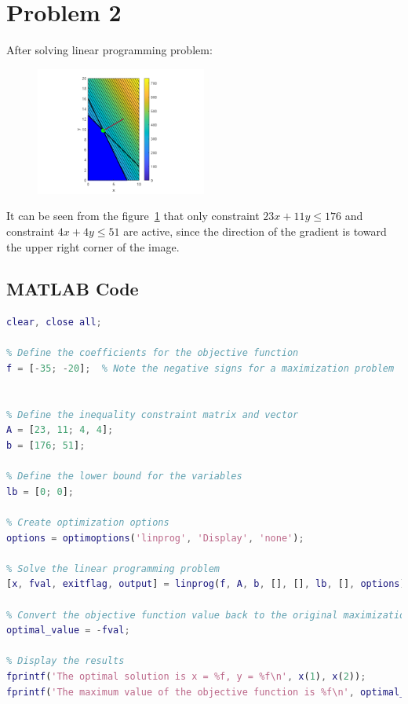 \documentclass[12pt]{article}
\begin{document}
\clearpage
\section{Problem 2}

After solving linear programming problem:

\begin{figure}[h]
    \centering
    \includegraphics[width=0.5\textwidth]{fig1.png}
    \caption{}
    \label{fig:figa}
\end{figure}

It can be seen from the figure~\ref{fig:figa} that only constraint $23 x+11 y \leq 176$ and constraint $4 x+4 y \leq 51$ are active, since the direction of the gradient is toward the upper right corner of the image.

\subsection{MATLAB Code}
\begin{lstlisting}[language=Matlab, basicstyle=\scriptsize]
clear, close all;

% Define the coefficients for the objective function
f = [-35; -20];  % Note the negative signs for a maximization problem


% Define the inequality constraint matrix and vector
A = [23, 11; 4, 4];
b = [176; 51];

% Define the lower bound for the variables
lb = [0; 0];

% Create optimization options
options = optimoptions('linprog', 'Display', 'none');

% Solve the linear programming problem
[x, fval, exitflag, output] = linprog(f, A, b, [], [], lb, [], options);

% Convert the objective function value back to the original maximization problem
optimal_value = -fval;

% Display the results
fprintf('The optimal solution is x = %f, y = %f\n', x(1), x(2));
fprintf('The maximum value of the objective function is %f\n', optimal_value);
\end{lstlisting}
\end{document}
